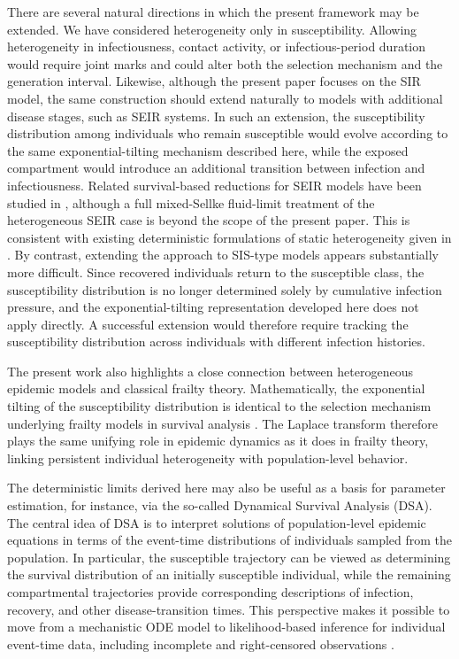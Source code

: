 \documentclass[pdflatex,sn-mathphys-ay]{sn-jnl}
\theoremstyle{thmstyleone}
\theoremstyle{thmstyletwo}
\theoremstyle{thmstylethree}
\begin{document}
There are several natural directions in which the present framework may be
extended. We have considered heterogeneity only in susceptibility. Allowing
heterogeneity in infectiousness, contact activity, or infectious-period
duration would require joint marks and could alter both the selection
mechanism and the generation interval. Likewise, although the present paper
focuses on the SIR model, the same construction should extend naturally to
models with additional disease stages, such as SEIR systems. In such an
extension, the susceptibility distribution among individuals who remain
susceptible would evolve according to the same exponential-tilting mechanism
described here, while the exposed compartment would introduce an additional
transition between infection and infectiousness. Related survival-based
reductions for SEIR models have been studied in \cite{KhudaBukhsh2024HowTo},
although a full mixed-Sellke fluid-limit treatment of the heterogeneous SEIR
case is beyond the scope of the present paper. This is consistent with
existing deterministic formulations of static heterogeneity
given in \cite{Novozhilov2008,DiekmannInaba2023,DiekmannHeesterbeekBritton2013}. By
contrast, extending the approach to SIS-type models appears substantially more
difficult. Since recovered individuals return to the susceptible class, the
susceptibility distribution is no longer determined solely by cumulative
infection pressure, and the exponential-tilting representation developed here
does not apply directly. A successful extension would therefore require
tracking the susceptibility distribution across individuals with different
infection histories.

The present work also highlights a close connection between heterogeneous
epidemic models and classical frailty theory. Mathematically, the exponential
tilting of the susceptibility distribution is identical to the selection
mechanism underlying frailty models in survival analysis
\citep{VaupelYashin1985,Aalen1994,WienkeEtAl2010}. The Laplace transform
therefore plays the same unifying role in epidemic dynamics as it does in
frailty theory, linking persistent individual heterogeneity with
population-level behavior.

The deterministic limits derived here may also be useful as a basis for parameter estimation, for instance, via the so-called   
Dynamical Survival Analysis (DSA). The central idea of DSA is to interpret
solutions of population-level epidemic equations in terms of the event-time
distributions of individuals sampled from the population. In particular, the
susceptible trajectory can be viewed as determining the survival distribution
of an initially susceptible individual, while the remaining compartmental
trajectories provide corresponding descriptions of infection, recovery, and
other disease-transition times. This perspective makes it possible to move
from a mechanistic ODE model to likelihood-based inference for individual
event-time data, including incomplete and right-censored observations
\citep{KhudaBukhshEtAl2020,DiLauroEtAl2022,RempalaKhudaBukhsh2023}.
\end{document}
